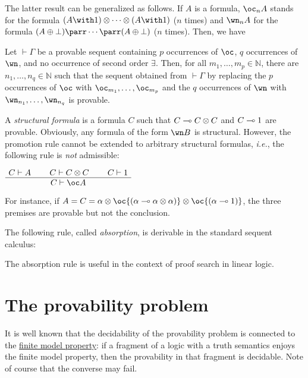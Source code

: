 The latter result can be generalized as follows. If \(A\) is a formula,
\(\oc_nA\) stands for the formula
\((A\with\one)\tens\cdots\tens(A\with\one)\) (\(n\) times) and
\(\wn_nA\) for the formula \((A\plus\bot)\parr\cdots\parr(A\plus\bot)\)
(\(n\) times). Then, we have

\begin{theorem}
Let $\vdash\Gamma$ be a provable sequent containing $p$ occurrences of $\oc$, $q$ occurrences of $\wn$, and no occurrence of second order $\exists$. Then, for all $m_1,\dotsc,m_p\in\mathbb N$, there are $n_1,\dotsc,n_q\in\mathbb N$ such that the sequent obtained from $\vdash\Gamma$ by replacing the $p$ occurrences of $\oc$ with $\oc_{m_1},\dotsc,\oc_{m_p}$ and the $q$ occurrences of $\wn$ with $\wn_{n_1},\dotsc,\wn_{n_q}$ is provable.
\end{theorem}

A \emph{structural formula} is a formula \(C\) such that
\(C\limp C\tens C\) and \(C\limp\one\) are provable. Obviously, any
formula of the form \(\wn B\) is structural. However, the promotion rule
cannot be extended to arbitrary structural formulas, \emph{i.e.}, the
following rule is \emph{not} admissible:

\(\AxRule{C\vdash A}
\AxRule{C\vdash C\tens C}
\AxRule{C\vdash\one}
\TriRule{C\vdash\oc A}
\DisplayProof\)

For instance, if
\(A=C=\alpha\tens\oc{(\alpha\limp\alpha\tens\alpha)}\tens\oc{(\alpha\limp\one)}\),
the three premises are provable but not the conclusion.

The following rule, called \emph{absorption}, is derivable in the
standard sequent calculus:
\begin{prooftree}
\end{prooftree}

The absorption rule is useful in the context of proof search in linear
logic.

\section{The provability problem}\label{the-provability-problem}

It is well known that the decidability of the provability problem is
connected to the \hyperref[phase-semantics]{finite model property}: if a
fragment of a logic with a truth semantics enjoys the finite model
property, then the provability in that fragment is decidable. Note of
course that the converse may fail.

